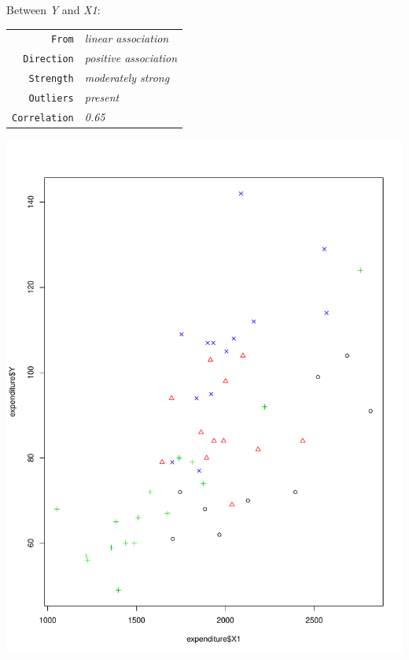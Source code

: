\documentclass[12pt,letterpaper]{article}
\begin{document}
\begin{itemize}
		Between \emph{Y} and \emph{X1}:
		\begin{tabular}{r|l}
			\texttt{From} &\emph{linear association} \\
			\texttt{Direction} & \emph{positive association}\\
			\texttt{Strength} &\emph{moderately strong} \\
			\texttt{Outliers} &  \emph{present}\\
			\texttt{Correlation} &  \emph{0.65} \\
		\end{tabular}
		
		\includegraphics[width=1\textwidth, angle=0]{Q3FinalPlot.pdf}
	\end{itemize}
	
\end{document}
